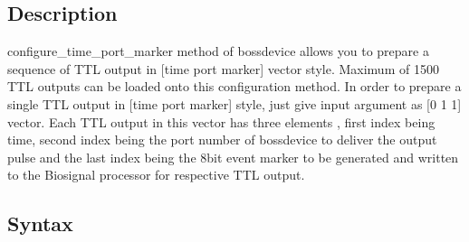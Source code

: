 \documentclass[letterpaper,10pt,english]{sphinxmanual}
\begin{document}
\subsection{Description}
\label{\detokenize{4_api_documentation:id7}}
\sphinxAtStartPar
configure\_time\_port\_marker method of bossdevice allows you to prepare a sequence of TTL output in {[}time port marker{]} vector style. Maximum of 1500 TTL outputs can be loaded onto this configuration method. In order to prepare a single TTL output in {[}time port marker{]} style, just give input argument as {[}0 1 1{]} vector.
Each TTL output in this vector has three elements , first index being time, second index being the port number of bossdevice to deliver the output pulse and the last index being the 8\sphinxhyphen{}bit event marker to be generated and written to the Biosignal processor for respective TTL output.


\subsection{Syntax}
\label{\detokenize{4_api_documentation:id8}}
\begin{sphinxVerbatim}[commandchars=\\\{\}]
\PYG{p}{[}\PYG{p}{]}
\end{sphinxVerbatim}
\end{document}
